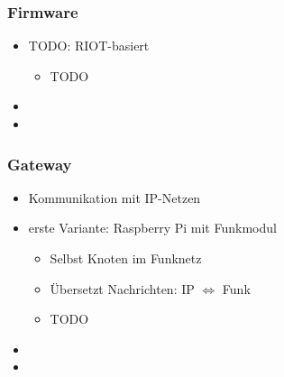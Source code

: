 \documentclass{beamer}
\begin{document}
\begin{frame}
    \frametitle{Firmware}

    \begin{itemize}
        \item TODO: RIOT-basiert
            \begin{itemize}
                \item TODO
            \end{itemize}
        \item
        \item
    \end{itemize}
\end{frame}

\begin{frame}
    \frametitle{Gateway}

    \begin{itemize}
        \item Kommunikation mit IP-Netzen
        \item erste Variante: Raspberry Pi mit Funkmodul
            \begin{itemize}
                \item Selbst Knoten im Funknetz
                \item Übersetzt Nachrichten: IP $\Leftrightarrow$ Funk
                \item    TODO
            \end{itemize}
        \item
        \item
    \end{itemize}
\end{frame}

%
%
%

\nocite*
{}
\end{document}
